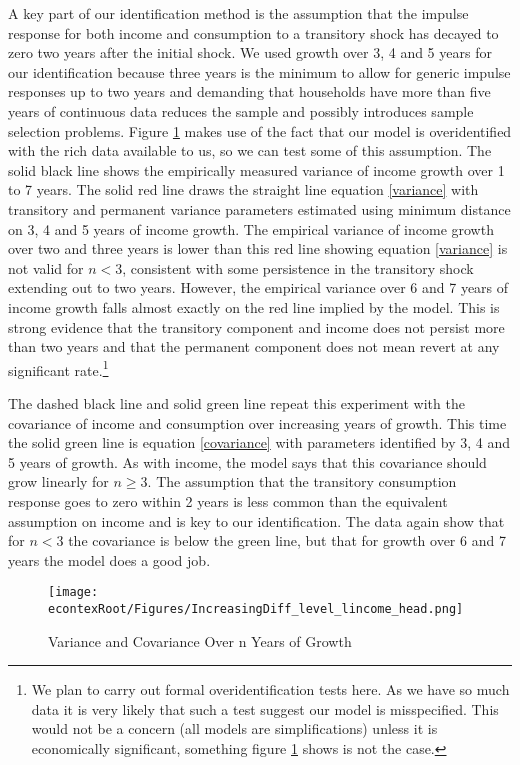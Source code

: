 A key part of our identification method is the assumption that the impulse response for both income and consumption to a transitory shock has decayed to zero two years after the initial shock. We used growth over 3, 4 and 5 years for our identification because three years is the minimum to allow for generic impulse responses up to two years and demanding that households have more than five years of continuous data reduces the sample and possibly introduces sample selection problems. Figure \ref{fig:IncreasingDiff} makes use of the fact that our model is overidentified with the rich data available to us, so we can test some of this assumption. The solid black line shows the empirically measured variance of income growth over 1 to 7 years. The solid red line draws the straight line equation \ref{variance} with transitory and permanent variance parameters estimated using minimum distance on 3, 4 and 5 years of income growth. The empirical variance of income growth over two and three years is lower than this red line showing equation \ref{variance} is not valid for $n < 3$, consistent with some persistence in the transitory shock extending out to two years. However, the empirical variance over 6 and 7 years of income growth falls almost exactly on the red line implied by the model. This is strong evidence that the transitory component and income does not persist more than two years and that the permanent component does not mean revert at any significant rate.\footnote{We plan to carry out formal overidentification tests here. As we have so much data it is very likely that such a test suggest our model is misspecified. This would not be a concern (all models are simplifications) unless it is economically significant, something figure \ref{fig:IncreasingDiff} shows is not the case.}

The dashed black line and solid green line repeat this experiment with the covariance of income and consumption over increasing years of growth. This time the solid green line is equation \ref{covariance} with parameters identified by 3, 4 and 5 years of growth. As with income, the model says that this covariance should grow linearly for $n \geq 3$. The assumption that the transitory consumption response goes to zero within 2 years is less common than the equivalent assumption on income and is key to our identification. The data again show that for $n < 3$ the covariance is below the green line, but that for growth over 6 and 7 years the model does a good job.
\begin{figure} 
	\begin{centering}
		\texttt{[image: \\econtexRoot/Figures/IncreasingDiff\_level\_lincome\_head.png]}
		\caption{Variance and Covariance Over n Years of Growth}
		\label{fig:IncreasingDiff}
	\end{centering}
\end{figure}

